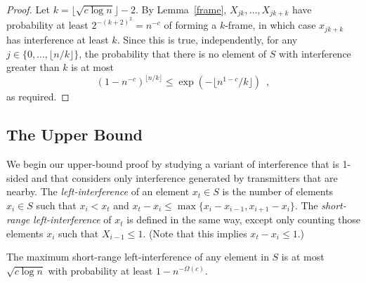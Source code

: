\documentclass{patmorin}
\begin{document}
\begin{proof}
Let $k=\lfloor \sqrt{c\log n} \rfloor-2$.  By Lemma~\ref{frame},
$X_{jk},\ldots,X_{jk+k}$ have probability at least $2^{-(k+2)^2} =
n^{-c}$ of forming a $k$-frame, in which case $x_{jk+k}$ has
interference at least $k$.  Since this is true, independently, for any
$j\in\{0,\ldots,\lfloor n/k\rfloor\}$, the probability that there is no
element of $S$ with interference greater than $k$ is at most
\[
   (1-n^{-c})^{\lfloor n/k\rfloor} \le \exp(-\lfloor n^{1-c}/k\rfloor) \enspace ,
\]
as required.
\end{proof}


\subsection{The Upper Bound}

We begin our upper-bound proof by studying a variant of interference that
is 1-sided and that considers only interference generated by transmitters
that are nearby.  The \emph{left-interference} of an element $x_t\in
S$ is the number of elements $x_i\in S$ such that $x_i < x_t$ and
$x_t-x_i \le \max\{x_i-x_{i-1},x_{i+1}-x_i\}$.  The \emph{short-range
left-interference} of $x_t$ is defined in the same way, except only
counting those elements $x_i$ such that $X_{i-1} \le 1$. (Note that this
implies $x_t-x_i \le 1$.)

\begin{lem}
\label{squeaker}
The maximum short-range left-interference of any element in $S$ is at
most $\sqrt{c\log n}$ with probability at least $1-n^{-\Omega(c)}$.
\end{lem}
\end{document}
